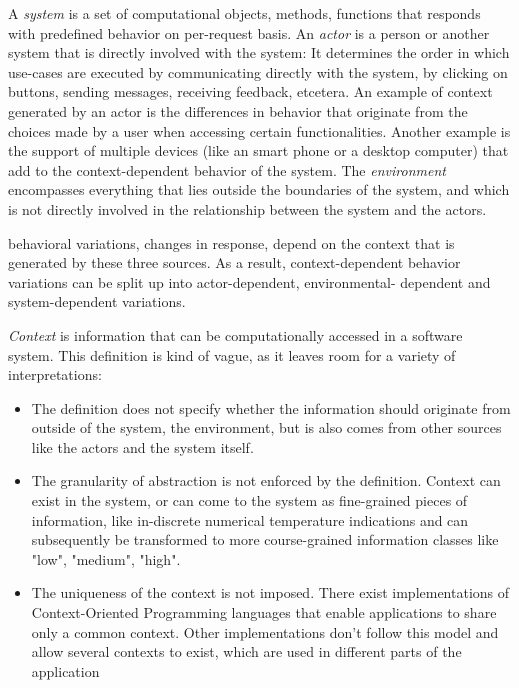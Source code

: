 \documentclass{acm_proc_article-sp}
\begin{document}
A \textit{system} is a set of computational objects, methods, functions that responds with predefined behavior on per-request basis. An \textit{actor} is a person or another system that is directly involved with the system: It determines the order in which use-cases are executed by communicating directly with the system, by clicking on buttons, sending messages, receiving feedback, etcetera. An example of context generated by an actor is the differences in behavior that originate from the choices made by a user when accessing certain functionalities. Another example is the support of multiple devices (like an smart phone or a desktop computer) that add to the context-dependent behavior of the system. The \textit{environment} encompasses everything that lies outside the boundaries of the system, and which is not directly involved in the relationship between the system and the actors.

behavioral variations, changes in response, depend on the context that is generated by these three sources. As a result, context-dependent behavior variations can be split up into actor-dependent, environmental- dependent and  system-\linebreak dependent variations.

\textit{Context} is information that can be computationally accessed in a software system. This definition is kind of vague, as it leaves room for a variety of interpretations:
\newpage 
\begin{itemize}
\item The definition does not specify whether the information should originate from outside of the system, the environment, but is also comes from other sources like the actors and the system itself.
\item The granularity of abstraction is not enforced by the definition. Context can exist in the system, or can come to the system as fine-grained pieces of information, like in-discrete numerical temperature indications and can subsequently be transformed to more course-grained information classes like "low", "medium", "high". 
\item The uniqueness of the context is not imposed. There exist implementations of Context-Oriented Programming languages that enable applications to share only a common context. Other implementations don't follow this model and allow several contexts to exist, which are used in different parts of the application \cite{Appeltauer:2009:CCP:1562112.1562118}
\end{itemize}
\end{document}
